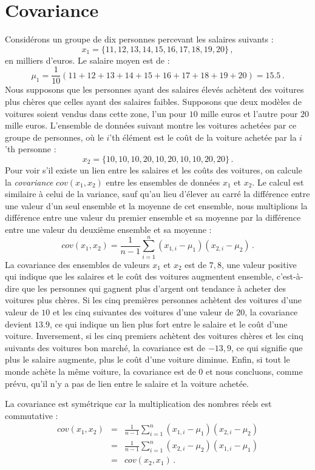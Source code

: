\section{Covariance}\label{a.covariance}

Considérons un groupe de dix personnes percevant les salaires suivants :
\[x_1=\{11,12,13,14,15,16,17,18,19,20\}\,,
\]
en milliers d'euros. Le salaire moyen est de :
\[
\mu_1=\frac{1}{10}(11+12+13+14+15+16+17+18+19+20)=15.5\,.
\]
Nous supposons que les personnes ayant des salaires élevés achètent des voitures plus chères que celles ayant des salaires faibles. Supposons que deux modèles de voitures soient vendus dans cette zone, l'un pour $10$ mille euros et l'autre pour $20$ mille euros. L'ensemble de données suivant montre les voitures achetées par ce groupe de personnes, où le $i$'th élément est le coût de la voiture achetée par la $i$'th personne :
\[
x_2=\{10,10,10,20,10,20,10,10,20,20\}\,.
\]
Pour voir s'il existe un lien entre les salaires et les coûts des voitures, on calcule la \emph{covariance} $\textit{cov}(x_1,x_2)$ entre les ensembles de données $x_1$ et $x_2$. Le calcul est similaire à celui de la variance, sauf qu'au lieu d'élever au carré la différence entre une valeur d'un seul ensemble et la moyenne de cet ensemble, nous multiplions la différence entre une valeur du premier ensemble et sa moyenne par la différence entre une valeur du deuxième ensemble et sa moyenne :
\[
\textit{cov}(x_1,x_2) = \frac{1}{n-1}\sum^n_{i=1} (x_{1,i}-\mu_1)(x_{2,i}-\mu_2)\,.\label{eq.cov}
\]
La covariance des ensembles de valeurs $x_1$ et $x_2$ est de $7,8$, une valeur positive qui indique que les salaires et le coût des voitures augmentent ensemble, c'est-à-dire que les personnes qui gagnent plus d'argent ont tendance à acheter des voitures plus chères. Si les cinq premières personnes achètent des voitures d'une valeur de $10$ et les cinq suivantes des voitures d'une valeur de $20$, la covariance devient $13.9$, ce qui indique un lien plus fort entre le salaire et le coût d'une voiture. Inversement, si les cinq premiers achètent des voitures chères et les cinq suivants des voitures bon marché, la covariance est de $-13,9$, ce qui signifie que plus le salaire augmente, plus le coût d'une voiture diminue. Enfin, si tout le monde achète la même voiture, la covariance est de $0$ et nous concluons, comme prévu, qu'il n'y a pas de lien entre le salaire et la voiture achetée.

La covariance est symétrique car la multiplication des nombres réels est commutative :
\begin{eqnarray*}
\textit{cov}(x_1,x_2) &=& \frac{1}{n-1}\sum^n_{i=1} (x_{1,i}-\mu_1)(x_{2,i}-\mu_2)\\
&=& \frac{1}{n-1}\sum^n_{i=1} (x_{2,i}-\mu_2)(x_{1,i}-\mu_1)\\
&=&\textit{cov}(x_2,x_1)\,.
\end{eqnarray*}

